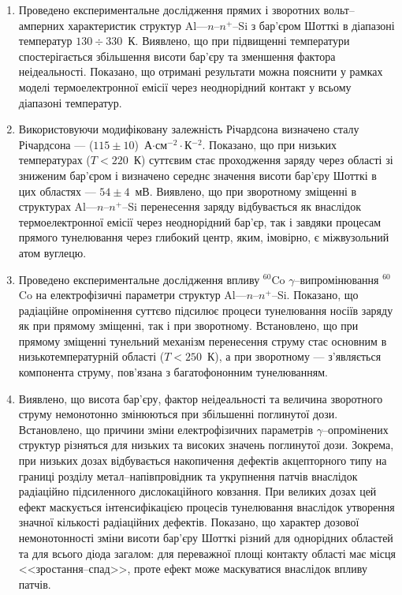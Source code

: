   \begin{enumerate}[leftmargin=0cm,itemindent=3em]
     \item Проведено експериментальне дослідження прямих і зворотних вольт--амперних характеристик структур Al---$n$--$n^+$--Si з бар'єром Шотткі в діапазоні температур $130\div330$~К.
Виявлено, що при підвищенні температури спостерігається збільшення висоти бар'єру та зменшення фактора неідеальності.
       Показано, що отримані результати можна пояснити у рамках моделі термоелектронної емісії через неоднорідний контакт у всьому діапазоні температур.

     \item Використовуючи модифіковану залежність Річардсона визначено сталу Річардсона --- ($115\pm10$)~А$\cdot$см$^{-2}\cdot$К$^{-2}$.
         Показано, що при низьких температурах ($T<220$~К) суттєвим стає проходження заряду через області зі зниженим бар'єром і визначено середнє значення висоти бар'єру Шотткі в цих областях --- $54\pm4$~мВ.
     Виявлено, що при зворотному зміщенні в структурах Al---$n$--$n^+$--Si перенесення заряду відбувається як внаслідок термоелектронної емісії через неоднорідний бар'єр, так і завдяки процесам прямого тунелювання через глибокий центр,
          яким, імовірно, є міжвузольний атом вуглецю.

\item Проведено експериментальне дослідження впливу $^{60}$Co $\gamma$--ви\-про\-мі\-ню\-ван\-ня $^{60}$Co на електрофізичні параметри структур Al---$n$--$n^+$--Si.
     Показано, що радіаційне опромінення суттєво підсилює процеси тунелювання носіїв заряду як при прямому зміщенні, так і при зворотному.
     Встановлено, що при прямому зміщенні тунельний механізм перенесення струму стає основним в низькотемпературній області ($T<250$~К),
а при зворотному --- з'являється компонента струму, пов'язана з багатофононним тунелюванням.


\item Виявлено, що висота бар'єру, фактор неідеальності та величина зворотного струму немонотонно змінюються при збільшенні поглинутої дози.
Встановлено, що причини зміни електрофізичних параметрів $\gamma$--оп\-ро\-мі\-не\-них структур різняться для низьких та високих значень поглинутої дози.
      Зокрема, при низьких дозах відбувається накопичення дефектів акцепторного типу на границі розділу
метал--напівпровідник та укрупнення патчів внаслідок радіаційно підсиленного дислокаційного ковзання.
 При великих дозах цей ефект маскується інтенсифікацією процесів тунелювання внаслідок утворення значної кількості радіаційних дефектів.
Показано, що характер дозової немонотонності зміни висоти бар'єру Шотткі різний для
      однорідних областей та для всього діода загалом:
   для переважної площі контакту області має місця <<зростання--спад>>, проте ефект може маскуватися внаслідок впливу патчів.



\end{enumerate}

